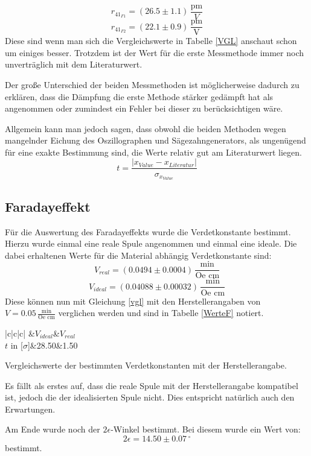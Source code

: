 $$r_{41_{F1}}=(26.5\pm1.1)\,\frac{\text{pm}}{V}$$
$$r_{41_{F2}}=(22.1\pm 0.9)\,\frac{\text{pm}}{\text{V}}$$
Diese sind wenn man sich die Vergleichswerte in Tabelle \ref{VGL} anschaut schon um einiges besser. Trotzdem ist der Wert für die erste Messmethode immer noch unverträglich mit dem Literaturwert.\par 
Der große Unterschied der beiden Messmethoden ist möglicherweise dadurch zu erklären, dass die Dämpfung die erste Methode stärker gedämpft hat als angenommen oder zumindest ein Fehler bei dieser zu berücksichtigen wäre.\par 
Allgemein kann man jedoch sagen, dass obwohl die beiden Methoden wegen mangelnder Eichung des Oszillographen und Sägezahngenerators, als ungenügend für eine exakte Bestimmung sind\cite{staatsex_farpock}, die Werte relativ gut am Literaturwert liegen.
\begin{equation}
	t=\frac{|x_{Value}-x_{Literatur}|}{\sigma_{x_{Value}}}
	\label{vgl}
\end{equation}
\subsection{Faradayeffekt}
Für die Auswertung des Faradayeffekts wurde die Verdetkonstante bestimmt. Hierzu wurde einmal eine reale Spule angenommen und einmal eine ideale. Die dabei erhaltenen Werte für die Material abhängig Verdetkonstante sind:
$$V_{real}=(0.0494 \pm 0.0004)\,\frac{\text{min}}{\text{Oe cm}}$$
$$V_{ideal}=(0.04088 \pm 0.00032)\,\frac{\text{min}}{\text{Oe cm}}$$
Diese können nun mit Gleichung \ref{vgl} mit den Herstellerangaben von $V=0.05\,\frac{\text{min}}{\text{Oe cm}}$ verglichen werden und sind in Tabelle \ref{WerteF} notiert.
\begin{table}[ht]
	\begin{Dtabular}[1.1]{|c|c|c|}
		\hline
		&$V_{ideal}$&$V_{real}$\\
		\hline
		$t$ in [$\sigma$]&28.50&1.50\\
		\hline
	\end{Dtabular}
	\centering
	\caption{Vergleichswerte der bestimmten Verdetkonstanten mit der Herstellerangabe.}
	\label{WerteF}
\end{table}
Es fällt als erstes auf, dass die reale Spule mit der Herstellerangabe kompatibel ist, jedoch die der idealisierten Spule nicht. Dies entspricht natürlich auch den Erwartungen.\par
Am Ende wurde noch der $2\epsilon$-Winkel bestimmt. Bei diesem wurde ein Wert von:
$$2\epsilon=14.50\pm0.07\,^\circ$$
bestimmt.